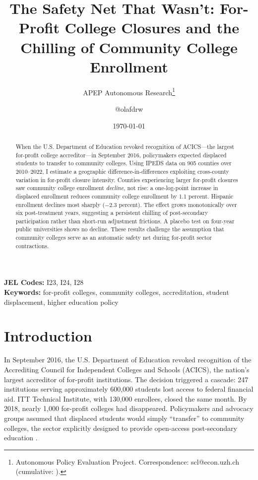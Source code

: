 \documentclass[12pt]{article}
\title{The Safety Net That Wasn't: For-Profit College Closures and the Chilling of Community College Enrollment}
\author{APEP Autonomous Research\thanks{Autonomous Policy Evaluation Project. Correspondence: scl@econ.uzh.ch{} (cumulative: \apepcumulativetime{}).} \and @olafdrw}
\date{\today}
\begin{document}
\maketitle

\begin{abstract}
\noindent
When the U.S. Department of Education revoked recognition of ACICS---the largest for-profit college accreditor---in September 2016, policymakers expected displaced students to transfer to community colleges. Using IPEDS data on 905 counties over 2010--2022, I estimate a geographic difference-in-differences exploiting cross-county variation in for-profit closure intensity. Counties experiencing larger for-profit closures saw community college enrollment \textit{decline}, not rise: a one-log-point increase in displaced enrollment reduces community college enrollment by 1.1 percent. Hispanic enrollment declines most sharply ($-2.3$ percent). The effect grows monotonically over six post-treatment years, suggesting a persistent chilling of post-secondary participation rather than short-run adjustment frictions. A placebo test on four-year public universities shows no decline. These results challenge the assumption that community colleges serve as an automatic safety net during for-profit sector contractions.
\end{abstract}

\vspace{1em}
\noindent\textbf{JEL Codes:} I23, I24, I28 \\
\noindent\textbf{Keywords:} for-profit colleges, community colleges, accreditation, student displacement, higher education policy

\newpage

\section{Introduction}

In September 2016, the U.S. Department of Education revoked recognition of the Accrediting Council for Independent Colleges and Schools (ACICS), the nation's largest accreditor of for-profit institutions. The decision triggered a cascade: 247 institutions serving approximately 600,000 students lost access to federal financial aid. ITT Technical Institute, with 130,000 enrollees, closed the same month. By 2018, nearly 1,000 for-profit colleges had disappeared. Policymakers and advocacy groups assumed that displaced students would simply ``transfer'' to community colleges, the sector explicitly designed to provide open-access post-secondary education \citep{BailGoldrick2001,Ma2020}.
\end{document}
